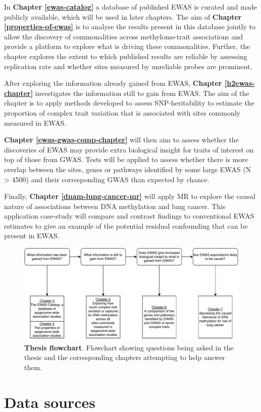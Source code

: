 \documentclass[11pt,oneside]{bristolthesis}
\begin{document}
In \textbf{Chapter \ref{ewas-catalog}} a database of published EWAS is curated and made publicly available, which will be used in later chapters. The aim of \textbf{Chapter \ref{properties-of-ewas}} is to analyse the results present in this database jointly to allow the discovery of commonalities across methylome-trait associations and provide a platform to explore what is driving these commonalities. Further, the chapter explores the extent to which published results are reliable by assessing replication rate and whether sites measured by unreliable probes are prominent.

After exploring the information already gained from EWAS, \textbf{Chapter \ref{h2ewas-chapter}} investigates the information still to gain from EWAS. The aim of the chapter is to apply methods developed to assess SNP-heritability to estimate the proportion of complex trait variation that is associated with sites commonly measured in EWAS.

\textbf{Chapter \ref{ewas-gwas-comp-chapter}} will then aim to assess whether the discoveries of EWAS may provide extra biological insight for traits of interest on top of those from GWAS. Tests will be applied to assess whether there is more overlap between the sites, genes or pathways identified by some large EWAS (N \textgreater{} 4500) and their corresponding GWAS than expected by chance.

Finally, \textbf{Chapter \ref{dnam-lung-cancer-mr}} will apply MR to explore the causal nature of associations between DNA methylation and lung cancer. This application case-study will compare and contrast findings to conventional EWAS estimates to give an example of the potential residual confounding that can be present in EWAS.




\begin{figure}

{\centering \includegraphics[width=1\linewidth]{figure/01-introduction/thesis-flowchart} 

}

\caption[Thesis flowchart]{\textbf{Thesis flowchart}. Flowchart showing questions being asked in the thesis and the corresponding chapters attempting to help answer them.}\label{fig:thesis-flowchart}
\end{figure}
\hypertarget{data-sources}{%
\chapter{Data sources}\label{data-sources}}
\end{document}
